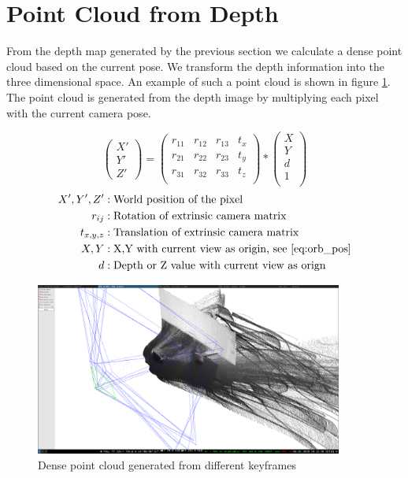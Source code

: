 \documentclass[11pt,a4paper,titlepage,oneside]{report}
\begin{document}
\section{Point Cloud from Depth}

From the depth map generated by the previous section we calculate a dense point cloud based on the current pose. We transform the depth information into the three dimensional space. An example of such a point cloud is shown in figure \ref{fig:pointcloud}. The point cloud is generated from the depth image by multiplying each pixel with the current camera pose.

\begin{equation}\label{eq:point_cloud_depth}
	\begin{pmatrix}
			X' \\
			Y' \\
			Z'
	\end{pmatrix}=
	\begin{pmatrix}
		r_{11} & r_{12} & r_{13} & t_x \\
		r_{21} & r_{22} & r_{23} & t_y \\
		r_{31} & r_{32} & r_{33} & t_z \\
	\end{pmatrix}*
	\begin{pmatrix}
		X\\
		Y\\
		d\\
		1\\
	\end{pmatrix}
\end{equation}
\begin{align*}
	X',Y',Z' &:		\text{World position of the pixel}\\
	r_{ij} &:			\text{Rotation of extrinsic camera matrix}\\
	t_{x,y,z} &:	\text{Translation of extrinsic camera matrix}\\
	X,Y &:				\text{X,Y with current view as origin, see \ref{eq:orb_pos}}\\
	d &:					\text{Depth or Z value with current view as orign}
\end{align*}

\begin{figure}[H]
  \begin{center}
		\includegraphics[width=0.9\textwidth]{img/pointcloud.png}
  \end{center}
	\caption{Dense point cloud generated from different keyframes}\label{fig:pointcloud}
\end{figure}
\end{document}
